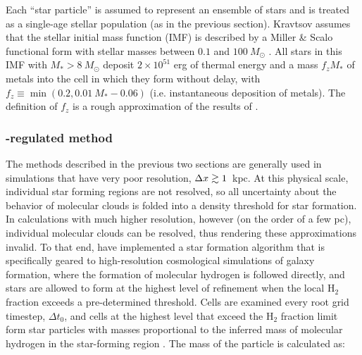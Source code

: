 Each ``star particle'' is assumed to represent an ensemble of stars
and is treated as a single-age stellar population (as in the previous
section).  Kravtsov assumes that the stellar initial mass function (IMF) is described by a Miller \&
Scalo functional form with stellar masses between $0.1$ and
$100~M_\odot$ \citep{1979ApJS...41..513M}.  All stars in this IMF with
$M_* > 8~M_\odot$ deposit $2 \times 10^{51}$ erg of thermal energy
and a mass $f_z M_*$ of metals into the cell in which they form
without delay, with $f_z \equiv \min(0.2, 0.01~M_*-0.06)$
(i.e. instantaneous deposition of metals).  The definition of $f_z$ is
a rough approximation of the results of \citet{1995ApJS..101..181W}.


\subsubsection{\HH-regulated method}
\label{sec:starform_H2reg}

The methods described in the previous two sections are generally used
in simulations that have very poor resolution, $\Delta x \gtrsim 1$~kpc.
At this physical scale, individual star forming regions are not
resolved, so all uncertainty about the behavior of molecular clouds is
folded into a density threshold for star formation.  In calculations
with much higher resolution, however (on the order of a few pc), individual
molecular clouds can be resolved, thus rendering these approximations
invalid.  To that end, \citet{2012ApJ...749...36K} have implemented
a star formation algorithm that is specifically geared to
high-resolution cosmological simulations of galaxy formation, where
the formation of molecular hydrogen is followed directly, and stars
are allowed to form at the highest level of refinement when the local
H$_2$ fraction exceeds a pre-determined threshold.  Cells are examined
every root grid timestep, $\Delta t_0$, and cells at the highest level
that exceed the H$_2$ fraction limit form star particles with masses
proportional to the inferred mass of molecular hydrogen in the
star-forming region
\citep{2008ApJ...689..865K,2009ApJ...693..216K,2010ApJ...709..308M}.
The mass of the particle is calculated as:

